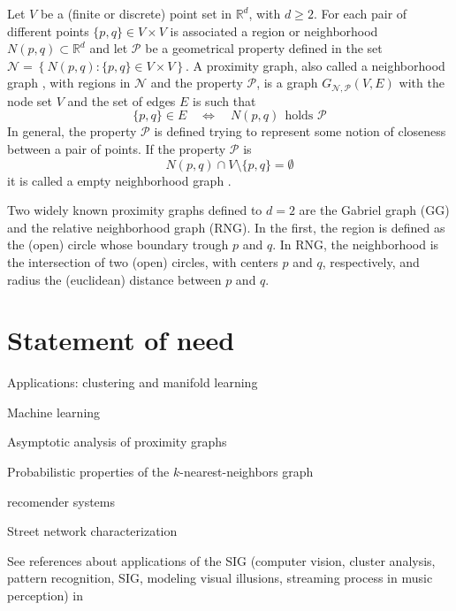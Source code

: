 \documentclass{article}
\begin{document}
 
 Let $V$ be a (finite or discrete) point set in  $\mathbb{R}^d$, with $d\geq 2$. For each pair of different points $\{p,q\}\in V\times V$ is associated a region or neighborhood $N(p,q) \subset \mathbb{R}^d$ and let $\mathcal{P}$ be a geometrical property defined in the set   $\mathcal{N} = \left\{ N(p,q) : \{p,q\} \in V \times V \right\}$. A proximity graph, also called a neighborhood graph \cite{Jaromczyk2002}, with regions in $\mathcal{N}$ and the property $\mathcal{P}$, is a graph $G_{\mathcal{N},\mathcal{P}}(V,E)$ with the node set $V$ and the set of edges $E$ is such that
 \begin{equation}
 	\{p,q\} \in E \quad \Leftrightarrow \quad  N(p,q)
 	\ \ \text{holds } \mathcal{P}
 \end{equation}
 In general, the property 
 $\mathcal{P}$ is defined trying to represent some notion of closeness between a pair of points.  If the property $\mathcal{P}$ is 
 \begin{equation}
 	N(p,q) \cap V \setminus \{p,q\} = \emptyset
\end{equation}
 it is called a empty neighborhood graph \cite{Cardinal2009}.
 
 Two widely known proximity graphs defined to $d=2$ are the Gabriel graph (GG) and the relative neighborhood graph (RNG). In the first, the region is defined as the (open) circle whose boundary trough $p$ and $q$. In RNG, the neighborhood is the intersection of two (open) circles, with centers $p$ and $q$, respectively, and radius the (euclidean) distance between $p$ and $q$.
 

\section*{Statement of need}

Applications: clustering and manifold learning \cite{Zemel2004}

Machine learning \cite{Yang2002}

Asymptotic analysis of proximity graphs  \cite{Devroye1988, Chalker1999}

Probabilistic properties of the $k$-nearest-neighbors graph \cite{Eppstein1997}

recomender systems \cite{Mathieson2019}

Street network characterization \cite{Watanabe2010, Osaragi2014, Maniadakis2016}

See references about applications of the SIG (computer vision, cluster analysis, pattern recognition, SIG, modeling visual illusions, streaming process in music perception) in \cite{Toussaint2014SIG}
\end{document}

